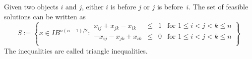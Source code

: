 \documentclass[11pt]{article}
\newcommand{\binary}{I\!\! B}
\begin{document}
         Given two objects $i$ and $j$, either $i$ is before $j$
         or $j$ is before~$i$.
The set of feasible solutions can be written as
\begin{displaymath}
S :=
\left\{ x \in \binary^{n(n-1)/2} :
\begin{array}{rcll}
x_{ij} + x_{jk} - x_{ik} & \leq & 1 & \mbox{for }1 \leq i < j < k \leq n  \\
- x_{ij} - x_{jk} + x_{ik} & \leq & 0 & \mbox{for } 1 \leq i < j < k \leq n  \\
\end{array}   \right\}
\end{displaymath}
The inequalities are called triangle inequalities.
\end{document}

